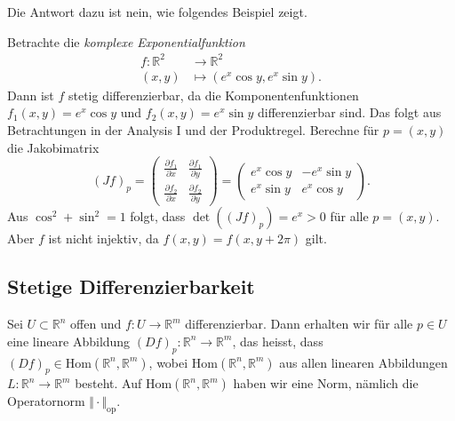 \documentclass[../main.tex]{subfiles}
\begin{document}
Die Antwort dazu ist nein, wie folgendes Beispiel zeigt.

\begin{example}
  Betrachte die \emph{komplexe Exponentialfunktion}
  \begin{align*}
    f \colon \mathbb{R}^2 & \to \mathbb{R}^2 \\
    (x, y) & \mapsto (e^{x} \cos y, e^x \sin y).
  \end{align*}
  Dann ist $f$ stetig differenzierbar, da die Komponentenfunktionen
  $f_1(x, y) = e^{x} \cos y$ und $f_2(x, y) = e^x \sin y$ 
  differenzierbar sind. Das folgt aus Betrachtungen in
  der Analysis I und der Produktregel.
  Berechne für $p = (x, y)$ die Jakobimatrix
  \[
    {(Jf)}_p =
    \begin{pmatrix}
      \frac{\partial f_1}{\partial x} & \frac{\partial f_1}{\partial y} \\
      \frac{\partial f_2}{\partial x} & \frac{\partial f_2}{\partial y}
    \end{pmatrix}
    =
    \begin{pmatrix}
      e^x \cos y & - e^x \sin y \\
      e^x \sin y & e^x \cos y
    \end{pmatrix}.
  \]
  Aus $\cos^2 + \sin^2 = 1$ folgt, dass $\det({(Jf)}_p) = e^x > 0$ 
  für alle $p = (x, y)$.
  Aber $f$ ist nicht injektiv, da $f(x, y) = f(x, y + 2 \pi)$ gilt.
\end{example}

\subsection*{Stetige Differenzierbarkeit}
Sei $U \subset \mathbb{R}^n$ offen und
$f \colon U \to \mathbb{R}^m$ differenzierbar.
Dann erhalten wir für alle $p \in U$ eine lineare
Abbildung ${(Df)}_p \colon \mathbb{R}^n \to \mathbb{R}^m$,
das heisst, dass ${(Df)}_p \in \text{Hom}(\mathbb{R}^n, \mathbb{R}^m)$,
wobei $\text{Hom}(\mathbb{R}^n, \mathbb{R}^m)$ aus
allen linearen Abbildungen $L \colon \mathbb{R}^n \to \mathbb{R}^m$ besteht.
Auf $\text{Hom}(\mathbb{R}^n, \mathbb{R}^m)$ haben wir
eine Norm, nämlich die Operatornorm $\Vert \cdot \Vert_{\text{op}}$.
\end{document}
